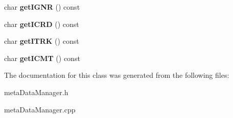 \begin{DoxyCompactItemize}
char {\bfseries get\+I\+G\+NR} () const
\item 
\mbox{\label{classMdManager_a5463430906c6858131e31cd133641b0b}} 
char {\bfseries get\+I\+C\+RD} () const
\item 
\mbox{\label{classMdManager_a18b6bcc652f86a2c028a2329745a1dae}} 
char {\bfseries get\+I\+T\+RK} () const
\item 
\mbox{\label{classMdManager_a7aa13463bd1ce9045c2941965c6c9e13}} 
char {\bfseries get\+I\+C\+MT} () const
\end{DoxyCompactItemize}


The documentation for this class was generated from the following files\+:\begin{DoxyCompactItemize}
\item 
meta\+Data\+Manager.\+h\item 
meta\+Data\+Manager.\+cpp\end{DoxyCompactItemize}
